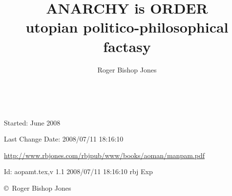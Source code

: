 \documentclass[10pt,a4paper.titlepage,openany,twocolumn]{book}
\author{Roger Bishop Jones}
\title{ANARCHY is ORDER\\utopian politico-philosophical factasy}
\date{\ }
\begin{document}
\begin{titlepage}
\maketitle

\vfill

\begin{centering}

{\footnotesize

Started: June 2008

Last Change $ $Date: 2008/07/11 18:16:10 $ $

\href{http://www.rbjones.com/rbjpub/www/books/aoman/manpam.pdf}
{http://www.rbjones.com/rbjpub/www/books/aoman/manpam.pdf}

$ $Id: aopamt.tex,v 1.1 2008/07/11 18:16:10 rbj Exp $ $

\copyright\ Roger Bishop Jones%

}%

\end{centering}

\thispagestyle{empty}
\end{titlepage}

{\parskip=0pt\tableofcontents}
\end{document}
